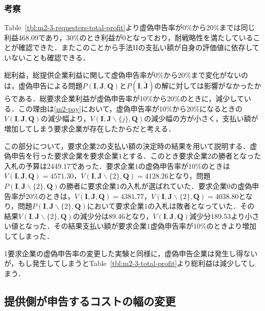 \hypertarget{ux8003ux5bdf-6}{%
\subsubsection{考察}\label{ux8003ux5bdf-6}}

Table~\ref{tbl:m2-3-requesters-total-profit}より虚偽申告率が0\%から20\%までは同じ利益468.09であり，30\%のとき利益が0となっており，耐戦略性を満たしていることが確認できた．またこのことから手法IIの支払い額が自身の評価値に依存していないことも確認できる．

総利益，総提供企業利益に関して虚偽申告率が0\%から20\%まで変化がないのは，虚偽申告による問題\(P(\boldsymbol{I},\boldsymbol{J},\boldsymbol{Q})\)と\(P(\boldsymbol{I},\boldsymbol{\tilde{J}})\)の解に対しては影響がなかったからである．総要求企業利益が虚偽申告率が10\%から20\%のときに，減少している．この理由は\eqref{m2-pay}において，虚偽申告率が10\%から20\%になるときの\(V(\boldsymbol{I},\boldsymbol{J},\boldsymbol{Q})\)の減少幅より，\(V(\boldsymbol{I},\boldsymbol{J}\backslash \{j\},\boldsymbol{Q})\)の減少幅の方が小さく，支払い額が増加してしまう要求企業が存在したからだと考える．

この部分について，要求企業\(2\)の支払い額の決定時の結果を用いて説明する．虚偽申告を行った要求企業を要求企業\(1\)とする．このとき要求企業\(2\)の勝者となった入札の予算は2449.17であった．要求企業\(1\)の虚偽申告率が10\%のときは\(V(\boldsymbol{I},\boldsymbol{J},\boldsymbol{Q})=4571.30\)，\(V(\boldsymbol{I},\boldsymbol{J}\backslash{\{2\}},\boldsymbol{Q})=4128.26\)となり，問題\(P(\boldsymbol{I},\boldsymbol{J}\backslash{\{2\}},\boldsymbol{Q})\)の勝者に要求企業\(1\)の入札が選ばれていた．要求企業\(0\)の虚偽申告率が20\%のときは，\(V(\boldsymbol{I},\boldsymbol{J},\boldsymbol{Q})=4381.77\)，\(V(\boldsymbol{I},\boldsymbol{J}\backslash{\{2\}},\boldsymbol{Q})=4038.80\)となり，問題\(P(\boldsymbol{I},\boldsymbol{J}\backslash{\{2\}},\boldsymbol{Q})\)において要求企業\(1\)の入札は敗者となっていた．その結果\(V(\boldsymbol{I},\boldsymbol{J}\backslash{\{2\}},\boldsymbol{Q})\)の減少分は89.46となり，\(V(\boldsymbol{I},\boldsymbol{J},\boldsymbol{Q})\)減少分189.53より小さい値となった．その結果支払い額が要求企業\(1\)虚偽申告率が10\%のときより増加してしまった．

1要求企業の虚偽申告率の変更した実験と同様に，虚偽申告企業は発生し得ないが，もし発生してしまうとTable~\ref{tbl:m2-3-total-profit}より総利益は減少してしまう．

\hypertarget{ux63d0ux4f9bux5074ux304cux7533ux544aux3059ux308bux30b3ux30b9ux30c8ux306eux5e45ux306eux5909ux66f4-1}{%
\subsection{提供側が申告するコストの幅の変更}\label{ux63d0ux4f9bux5074ux304cux7533ux544aux3059ux308bux30b3ux30b9ux30c8ux306eux5e45ux306eux5909ux66f4-1}}

